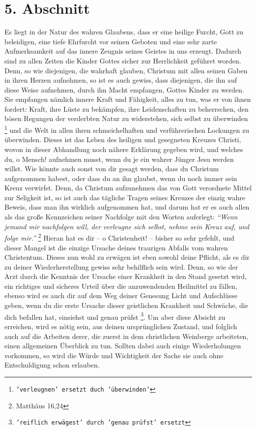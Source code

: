 \section{5. Abschnitt}  \label{kap2_ab5}

Es liegt in der Natur des wahren Glaubens, dass er eine heilige Furcht, Gott zu
beleidigen, eine tiefe Ehrfurcht vor seinen Geboten und eine sehr zarte
Aufmerksamkeit auf das innere Zeugnis seines Geistes in uns erzeugt. Dadurch
sind zu allen Zeiten die Kinder Gottes sicher zur Herrlichkeit geführet worden.
Denn, so wie diejenigen, die wahrhaft glauben, Christum mit allen seinen Gaben
in ihren Herzen aufnehmen, so ist es auch gewiss, dass diejenigen, die ihn auf
diese Weise aufnehmen, durch ihn Macht empfangen, Gottes Kinder zu werden. Sie
empfangen nämlich innere Kraft und Fähigkeit, alles zu tun, was er von ihnen
fordert: Kraft, ihre Lüste zu bekämpfen, ihre Leidenschaften zu beherrschen, den
bösen Regungen der verderbten Natur zu widerstehen, sich selbst zu überwinden 
\footnote{\texttt{'verleugnen' ersetzt duch 'überwinden'}}
und die Welt in allen ihren schmeichelhaften und verführerischen Lockungen zu
überwinden. Dieses ist das Leben des heiligen und gesegneten Kreuzes Christi,
wovon in dieser Abhandlung noch nähere Erklärung gegeben wird, und welches du, o
Mensch! aufnehmen musst, wenn du je ein wahrer Jünger Jesu werden willst. Wie
könnte auch sonst von dir gesagt werden, dass du Christum aufgenommen habest,
oder dass du an ihn glaubst, wenn du noch immer sein Kreuz verwirfst. Denn, da
Christum aufzunehmen das von Gott verordnete Mittel zur Seligkeit ist, so ist
auch das tägliche Tragen seines Kreuzes der einzig wahre Beweis, dass man ihn
wirklich aufgenommen hat, und darum hat er es auch allen als das große
Kennzeichen seiner Nachfolge mit den Worten auferlegt:
\textit{"`Wenn jemand mir nachfolgen will, der verleugne sich selbst, nehme sein
Kreuz auf, und folge mir."'}
\footnote{Matthäus 16,24}
Hieran hat es dir -- o Christenheit! -- bisher so sehr gefehlt, und dieser
Mangel ist die einzige Ursache deines traurigen Abfalls vom wahren Christentum. Dieses
nun wohl zu erwägen ist eben sowohl deine Pflicht, als es dir zu deiner
Wiederherstellung gewiss sehr behilflich sein wird. Denn, so wie der Arzt durch
die Kenntnis der Ursache einer Krankheit in den Stand gesetzt wird, ein
richtiges und sicheres Urteil über die anzuwendenden Heilmittel zu fällen, ebenso 
wird es auch dir auf dem Weg deiner Genesung Licht und Aufschlüsse geben,
wenn du die erste Ursache dieser geistlichen Krankheit und Schwäche, die dich
befallen hat, einsiehst und genau prüfst
\footnote{\texttt{'reiflich erwägest' durch 'genau prüfst' ersetzt}}.
Um aber diese Absicht zu
erreichen, wird es nötig sein, aus deinen ursprünglichen Zustand, und folglich
auch auf die Arbeiten derer, die zuerst in dem christlichen Weinberge
arbeiteten, einen allgemeinen Überblick zu tun. Sollten dabei auch einige
Wiederholungen vorkommen, so wird die Würde und Wichtigkeit der Sache sie auch
ohne Entschuldigung schon erlauben.

